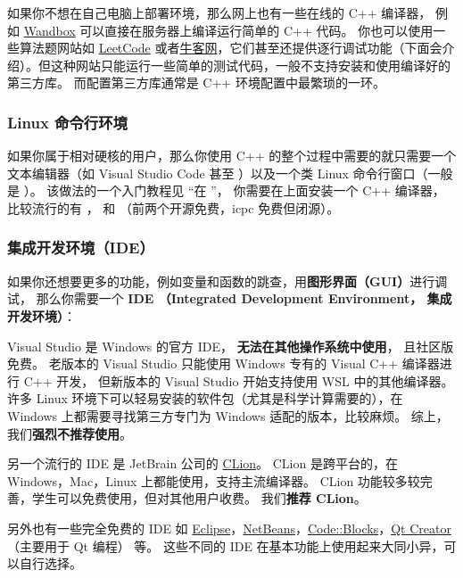 如果你不想在自己电脑上部署环境，那么网上也有一些在线的 C++ 编译器， 例如 \href{https://wandbox.org/}{Wandbox} 可以直接在服务器上编译运行简单的 C++ 代码。 你也可以使用一些算法题网站如 \href{https://leetcode.com/}{LeetCode} 或者\href{https://www.nowcoder.com/}{牛客网}，它们甚至还提供逐行调试功能（下面会介绍）。但这种网站只能运行一些简单的测试代码，一般不支持安装和使用编译好的第三方库。 而配置第三方库通常是 C++ 环境配置中最繁琐的一环。

\subsubsection{Linux 命令行环境}
如果你属于相对硬核的用户，那么你使用 C++ 的整个过程中需要的就只需要一个文本编辑器（如 Visual Studio Code 甚至 ）以及一个类 Linux 命令行窗口（一般是 ）。 该做法的一个入门教程见 “在 ”， 你需要在上面安装一个 C++ 编译器， 比较流行的有 ，  和 （前两个开源免费，icpc 免费但闭源）。

\subsubsection{集成开发环境（IDE）}
如果你还想要更多的功能，例如变量和函数的跳查，用\textbf{图形界面（GUI）}进行调试， 那么你需要一个 \textbf{IDE （Integrated Development Environment， 集成开发环境）}：

Visual Studio 是 Windows 的官方 IDE， \textbf{无法在其他操作系统中使用}， 且社区版免费。 老版本的 Visual Studio 只能使用 Windows 专有的 Visual C++ 编译器进行 C++ 开发， 但新版本的 Visual Studio 开始支持使用 WSL 中的其他编译器。 许多 Linux 环境下可以轻易安装的软件包（尤其是科学计算需要的），在 Windows 上都需要寻找第三方专门为 Windows 适配的版本，比较麻烦。 综上，我们\textbf{强烈不推荐使用}。

另一个流行的 IDE 是 JetBrain 公司的 \href{https://www.jetbrains.com/clion/}{CLion}。 CLion 是跨平台的，在 Windows，Mac，Linux 上都能使用，支持主流编译器。 CLion 功能较多较完善，学生可以免费使用，但对其他用户收费。 我们\textbf{推荐 CLion}。

另外也有一些完全免费的 IDE 如 \href{https://eclipseide.org/}{Eclipse}，\href{https://netbeans.apache.org/front/main/index.html}{NetBeans}，\href{https://www.codeblocks.org/}{Code::Blocks}，\href{https://www.qt.io/product/development-tools}{Qt Creator} （主要用于 Qt 编程） 等。 这些不同的 IDE 在基本功能上使用起来大同小异，可以自行选择。


